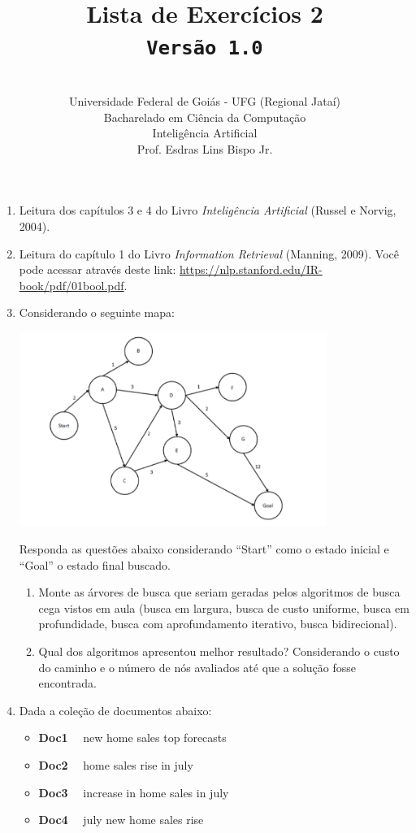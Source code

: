 \documentclass[12pt,a4paper,oneside]{article}
\author{\\Universidade Federal de Goiás - UFG (Regional Jataí) \\Bacharelado em Ciência da Computação \\Inteligência Artificial \\Prof. Esdras Lins Bispo Jr.}
\title{
	{\sc \huge Lista de Exercícios 2} 
	\\{\tt Versão 1.0}
}
\begin{document}
\maketitle

\begin{enumerate}

	\item Leitura dos capítulos 3 e 4 do Livro {\it Inteligência Artificial} (Russel e Norvig, 2004).
	
	\item Leitura do capítulo 1 do Livro {\it Information Retrieval} (Manning, 2009). Você pode acessar através deste link: \url{https://nlp.stanford.edu/IR-book/pdf/01bool.pdf}.
	
	\item Considerando o seguinte mapa:
	
	\begin{center}
		\includegraphics[width=10cm]{images/fig04.png}
	\end{center}
	
	Responda as questões abaixo considerando ``Start'' como o estado inicial e ``Goal'' o estado final buscado.
	
	\begin{enumerate}
		\item Monte as árvores de busca que seriam geradas pelos algoritmos de busca cega vistos em aula (busca em largura, busca de custo uniforme, busca em profundidade, busca com aprofundamento iterativo, busca bidirecional).
		\item Qual dos algoritmos apresentou melhor resultado? Considerando o custo do caminho e o número de nós avaliados até que a solução fosse encontrada.
	\end{enumerate}

	\item Dada a coleção de documentos abaixo:
	
	\begin{itemize}
		\item[] {\bf Doc1} \ \ new home sales top forecasts
		\item[] {\bf Doc2} \ \ home sales rise in july
		\item[] {\bf Doc3} \ \ increase in home sales in july
		\item[] {\bf Doc4} \ \ july new home sales rise
	\end{itemize}
	

\end{enumerate}
\end{document}
